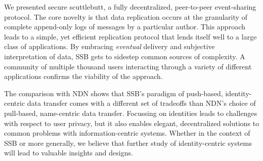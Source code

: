 \documentclass[10pt,sigconf,rewiew]{acmart}
\begin{document}
We presented secure scuttlebutt, a fully decentralized, peer-to-peer event-sharing protocol. The core novelty is that data replication occurs at the granularity of complete append-only logs of messages by a particular author. This approach leads to a simple, yet efficient replication protocol that lends itself well to a large class of applications. By embracing \textit{eventual} delivery and subjective interpretation of data, SSB gets to sidestep common sources of complexity. A community of multiple thousand users interacting through a variety of different applications confirms the viability of the approach.

The comparison with NDN shows that SSB's paradigm of push-based, identity-centric data transfer comes with a different set of tradeoffs than NDN's choice of pull-based, name-centric data transfer. Focussing on identities leads to challenges with respect to user privacy, but it also enables elegant, decentralized solutions to common problems with information-centric systems. Whether in the context of SSB or more generally, we believe that further study of identity-centric systems will lead to valuable insights and designs.

\newpage
\clearpage
\newpage


\end{document}
